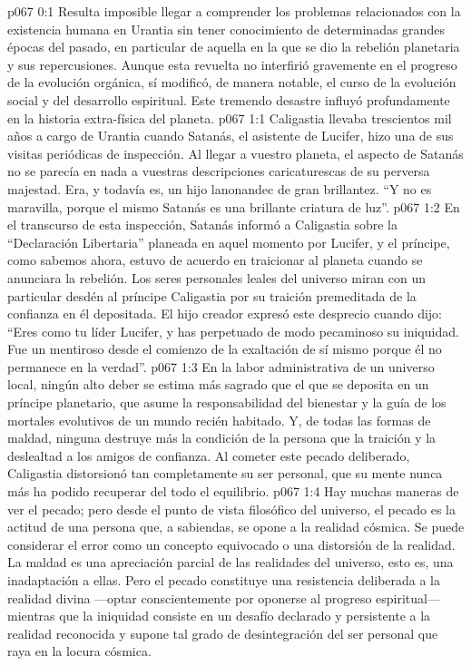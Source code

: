 \author{Melquisedec}
\vs p067 0:1 Resulta imposible llegar a comprender los problemas relacionados con la existencia humana en Urantia sin tener conocimiento de determinadas grandes épocas del pasado, en particular de aquella en la que se dio la rebelión planetaria y sus repercusiones. Aunque esta revuelta no interfirió gravemente en el progreso de la evolución orgánica, sí modificó, de manera notable, el curso de la evolución social y del desarrollo espiritual. Este tremendo desastre influyó profundamente en la historia extra\hyp{}física del planeta.
\vs p067 1:1 Caligastia llevaba trescientos mil años a cargo de Urantia cuando Satanás, el asistente de Lucifer, hizo una de sus visitas periódicas de inspección. Al llegar a vuestro planeta, el aspecto de Satanás no se parecía en nada a vuestras descripciones caricaturescas de su perversa majestad. Era, y todavía es, un hijo lanonandec de gran brillantez. “Y no es maravilla, porque el mismo Satanás es una brillante criatura de luz”.
\vs p067 1:2 En el transcurso de esta inspección, Satanás informó a Caligastia sobre la “Declaración Libertaria” planeada en aquel momento por Lucifer, y el príncipe, como sabemos ahora, estuvo de acuerdo en traicionar al planeta cuando se anunciara la rebelión. Los seres personales leales del universo miran con un particular desdén al príncipe Caligastia por su traición premeditada de la confianza en él depositada. El hijo creador expresó este desprecio cuando dijo: “Eres como tu líder Lucifer, y has perpetuado de modo pecaminoso su iniquidad. Fue un mentiroso desde el comienzo de la exaltación de sí mismo porque él no permanece en la verdad”.
\vs p067 1:3 En la labor administrativa de un universo local, ningún alto deber se estima más sagrado que el que se deposita en un príncipe planetario, que asume la responsabilidad del bienestar y la guía de los mortales evolutivos de un mundo recién habitado. Y, de todas las formas de maldad, ninguna destruye más la condición de la persona que la traición y la deslealtad a los amigos de confianza. Al cometer este pecado deliberado, Caligastia distorsionó tan completamente su ser personal, que su mente nunca más ha podido recuperar del todo el equilibrio.
\vs p067 1:4 \pc Hay muchas maneras de ver el pecado; pero desde el punto de vista filosófico del universo, el pecado es la actitud de una persona que, a sabiendas, se opone a la realidad cósmica. Se puede considerar el error como un concepto equivocado o una distorsión de la realidad. La maldad es una apreciación parcial de las realidades del universo, esto es, una inadaptación a ellas. Pero el pecado constituye una resistencia deliberada a la realidad divina ---optar conscientemente por oponerse al progreso espiritual--- mientras que la iniquidad consiste en un desafío declarado y persistente a la realidad reconocida y supone tal grado de desintegración del ser personal que raya en la locura cósmica.
